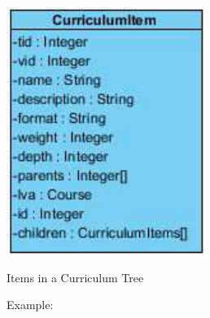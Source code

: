 \begin{DoxyImage}
\includegraphics{CurriculumItem}
\caption{Items in a Curriculum Tree}
\end{DoxyImage}
Example\+: 
